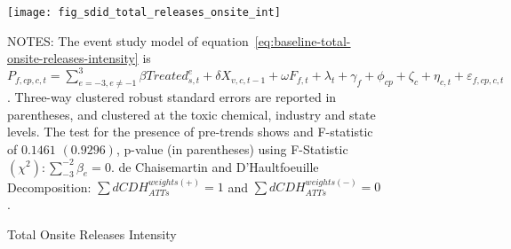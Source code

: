 \begin{figure}[H]
    \centering
    \texttt{[image: fig\_sdid\_total\_releases\_onsite\_int]}
    \caption{Total Onsite Releases Intensity}
    \label{fig:baseline-total-onsite-releases-intensity}
    \begin{minipage}{18cm}
        \vspace{0.05in}
        NOTES: The event study model of equation~\ref{eq:baseline-total-onsite-releases-intensity} is $P_{f,cp,c,t} = \sum_{{e = -3},{e \neq -1}}^{3} \beta Treated_{s,t}^e + \delta X_{v,c,t-1} + \omega F_{f,t} + \lambda_{t} + \gamma_{f} + \phi_{cp} + \zeta_{c} + \eta_{c,t} + \varepsilon_{f,cp,c,t}$. Three-way clustered robust standard errors are reported in parentheses, and clustered at the toxic chemical, industry and state levels. The test for the presence of pre-trends shows and F-statistic of $0.1461$ $(0.9296)$, p-value (in parentheses) using F-Statistic $(\chi^2): \sum_{-3}^{-2} \beta_{e} = 0$. de Chaisemartin and D'Haultfoeuille Decomposition: $\sum dCDH_{ATTs}^{weights(+)} = 1$ and $\sum dCDH_{ATTs}^{weights(-)} = 0$.
    \end{minipage}
\end{figure}